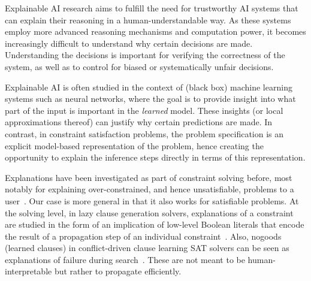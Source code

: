 


Explainable AI research aims to fulfill the need for trustworthy AI systems that can explain their reasoning in a human-understandable way. 
As these systems employ more advanced reasoning mechanisms and computation power, it becomes increasingly difficult to understand why certain decisions are made. 
Understanding the decisions is important for verifying the correctness of the system, as well as to control for biased or systematically unfair decisions.

Explainable AI is often studied in the context of (black box) machine learning systems such as neural networks, where the goal is to provide insight into what part of the input is important in the \textit{learned} model. These insights (or local approximations thereof) can justify why certain predictions are made. In contrast, in constraint satisfaction problems, the problem specification is an explicit model-based representation of the problem, hence creating the opportunity to explain the inference steps directly in terms of this representation.

Explanations have been investigated as part of constraint solving before, most notably for explaining over-constrained, and hence unsatisfiable, problems to a user~\cite{junker2001quickxplain}. Our case is more general in that it also works for satisfiable problems. At the solving level, in lazy clause generation solvers, explanations of a constraint are studied in the form of an implication of low-level Boolean literals that encode the result of a propagation step of an individual constraint~\cite{feydy2009lazy}. Also, nogoods (learned clauses) in conflict-driven clause learning SAT solvers can be seen as explanations of failure during search~\cite{marques2009conflict}. These are not meant to be human-interpretable but rather to propagate efficiently.


